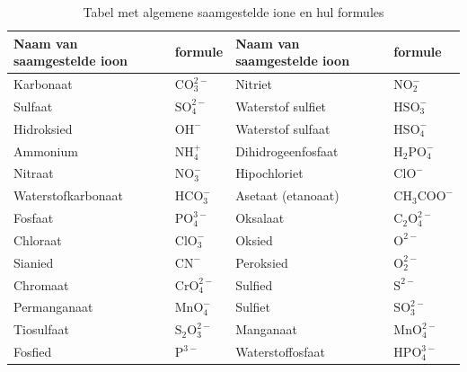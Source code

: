           \begin{table}[H]
        \begin{center}
      \label{m38689*uid99}
    \noindent
      \begin{tabular}{|l|l|l|l|}\hline
                  \textbf{Naam van saamgestelde ioon} &
                  \textbf{formule} &  \textbf{Naam van saamgestelde ioon} & \textbf{formule} \\ \hline
        Karbonaat & $\mathrm{CO}_{3}^{2-}$ & Nitriet & $\mathrm{NO}_{2}^{-}$ \\ \hline
        Sulfaat &  $\mathrm{SO}_{4}^{2-}$ & Waterstof sulfiet & $\mathrm{HSO}_{3}^{-}$ \\ \hline
        Hidroksied & ${\mathrm{OH}}^{-}$ & Waterstof sulfaat & $\mathrm{HSO}_{4}^{-}$ \\ \hline
        Ammonium & $\mathrm{NH}_{4}^{+}$ & Dihidrogeenfosfaat & ${\mathrm{H}}_{2}\mathrm{PO}_{4}^{-}$ \\ \hline
        Nitraat & $\mathrm{NO}_{3}^{-}$ & Hipochloriet & ${\mathrm{ClO}}^{-}$ \\ \hline
        Waterstofkarbonaat & $\mathrm{HCO}_{3}^{-}$ & Asetaat (etanoaat)  & ${\mathrm{CH}}_{3}{\mathrm{COO}}^{-}$ \\ \hline
        Fosfaat & $\mathrm{PO}_{4}^{3-}$ & Oksalaat & ${\mathrm{C}}_{2}\mathrm{O}_{4}^{2-}$ \\ \hline
        Chloraat & $\mathrm{ClO}_{3}^{-}$ &  Oksied & ${\mathrm{O}}^{2-}$ \\ \hline
        Sianied & ${\mathrm{CN}}^{-}$ & Peroksied & $\mathrm{O}_{2}^{2-}$ \\ \hline
        Chromaat & $\mathrm{CrO}_{4}^{2-}$ & Sulfied & ${\mathrm{S}}^{2-}$ \\ \hline
        Permanganaat & $\mathrm{MnO}_{4}^{-}$ & Sulfiet & $\mathrm{SO}_{3}^{2-}$ \\ \hline
        Tiosulfaat & ${\mathrm{S}}_{2}\mathrm{O}_{3}^{2-}$ & Manganaat & $\mathrm{MnO}_{4}^{2-}$ \\ \hline
        Fosfied & ${\mathrm{P}}^{3-}$ & Waterstoffosfaat & $\mathrm{HPO}_{4}^{3-}$ \\ \hline
    \end{tabular}
      \end{center}
    \caption{Tabel met algemene saamgestelde ione en hul formules}
\label{tab:ions}
\end{table}
    \par
	\par

